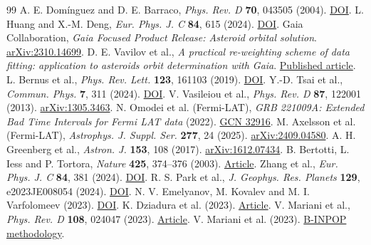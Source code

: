 \documentclass[11pt,a4paper]{article}
\begin{document}
\begin{thebibliography}{99}
 A. E. Domínguez and D. E. Barraco,
  \emph{Phys. Rev. D} \textbf{70}, 043505 (2004).
  \href{https://doi.org/10.1103/PhysRevD.70.043505}{DOI}.
 L. Huang and X.-M. Deng,
  \emph{Eur. Phys. J. C} \textbf{84}, 615 (2024).
  \href{https://link.springer.com/article/10.1140/epjc/s10052-024-12969-2}{DOI}.
 Gaia Collaboration,
  \emph{Gaia Focused Product Release: Asteroid orbital solution}.
  \href{https://arxiv.org/abs/2310.14699}{arXiv:2310.14699}.
 D. E. Vavilov et al.,
  \emph{A practical re-weighting scheme of data fitting: application to asteroids orbit determination with Gaia}.
  \href{https://doi.org/10.1016/j.icarus.2026.117074}{Published article}.
 L. Bernus et al., \emph{Phys. Rev. Lett.} \textbf{123}, 161103 (2019).
  \href{https://doi.org/10.1103/PhysRevLett.123.161103}{DOI}.
 Y.-D. Tsai et al., \emph{Commun. Phys.} \textbf{7}, 311 (2024).
  \href{https://doi.org/10.1038/s42005-024-01779-3}{DOI}.
 V. Vasileiou et al., \emph{Phys. Rev. D} \textbf{87}, 122001 (2013).
  \href{https://arxiv.org/abs/1305.3463}{arXiv:1305.3463}.
 N. Omodei et al. (Fermi-LAT),
  \emph{GRB 221009A: Extended Bad Time Intervals for Fermi LAT data} (2022).
  \href{https://gcn.nasa.gov/circulars/32916}{GCN 32916}.
 M. Axelsson et al. (Fermi-LAT), \emph{Astrophys. J. Suppl. Ser.} \textbf{277}, 24 (2025).
  \href{https://arxiv.org/abs/2409.04580}{arXiv:2409.04580}.
 A. H. Greenberg et al., \emph{Astron. J.} \textbf{153}, 108 (2017).
  \href{https://arxiv.org/abs/1612.07434}{arXiv:1612.07434}.
 B. Bertotti, L. Iess and P. Tortora, \emph{Nature} \textbf{425}, 374--376 (2003). \href{https://www.nature.com/articles/nature01997}{Article}.
 Zhang et al., \emph{Eur. Phys. J. C} \textbf{84}, 381 (2024). \href{https://doi.org/10.1140/epjc/s10052-024-12723-8}{DOI}.
 R. S. Park et al., \emph{J. Geophys. Res. Planets} \textbf{129}, e2023JE008054 (2024). \href{https://doi.org/10.1029/2023JE008054}{DOI}.
 N. V. Emelyanov, M. Kovalev and M. I. Varfolomeev (2023). \href{https://doi.org/10.1093/mnras/stad958}{DOI}.
 K. Dziadura et al. (2023). \href{https://www.aanda.org/articles/aa/pdf/2023/12/aa47342-23.pdf}{Article}.
 V. Mariani et al., \emph{Phys. Rev. D} \textbf{108}, 024047 (2023). \href{https://arxiv.org/abs/2306.07069}{Article}.
 V. Mariani et al. (2023). \href{https://arxiv.org/abs/2303.05298}{B-INPOP methodology}.


\end{thebibliography}
\end{document}
